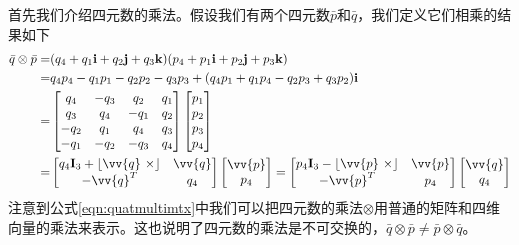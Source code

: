 \documentclass[11pt]{article}
\begin{document}
首先我们介绍四元数的乘法。假设我们有两个四元数$\bar{p}$和$\bar{q}$，我们定义它们相乘的结果如下
\begin{align}
\bar{q} \otimes \bar{p} = &  (q_4 + q_1\mathbf{i} + q_2\mathbf{j}+ q_3\mathbf{k}) (p_4 + p_1\mathbf{i} + p_2\mathbf{j}+ p_3\mathbf{k})   \\
 = & q_4 p_4 - q_1 p_1 - q_2 p_2 - q_3 p_3 + (q_4 p_1 + q_1 p_4 - q_2 p_3 + q_3 p_2 ) \mathbf{i}\\
                 = &\begin{bmatrix}
                      q_4 & -q_3 & q_2 & q_1 \\
                      q_3 & q_4 & -q_1 & q_2 \\
                      -q_2 & q_1 & q_4 & q_3 \\
                      -q_1 & -q_2 & -q_3 & q_4 \\
                     \end{bmatrix} \begin{bmatrix}
                      p_1\\p_2\\p_3\\p_4
                     \end{bmatrix} \\
\label{eqn:quatmultimtx}          = & \begin{bmatrix}
                      q_4\mathbf{I}_3+\lfloor \vv{q} \ \times \rfloor   & \vv{q} \\
                      -\vv{q}^T & q_4  
                     \end{bmatrix} \begin{bmatrix}
                                     \vv{p}\\
                                     p_4
                                \end{bmatrix} =  \begin{bmatrix}
                                            p_4\mathbf{I}_3-\lfloor \vv{p} \ \times \rfloor   & \vv{p} \\
                                            -\vv{p}^T & p_4  
                                    \end{bmatrix} \begin{bmatrix}
                                            \vv{q}\\
                                            q_4
                                    \end{bmatrix}
\end{align}
注意到公式\ref{eqn:quatmultimtx}中我们可以把四元数的乘法$\otimes$用普通的矩阵和四维向量的乘法来表示。这也说明了四元数的乘法是不可交换的，$\bar{q} \otimes \bar{p} \neq \bar{p} \otimes \bar{q}$。
\end{document}
